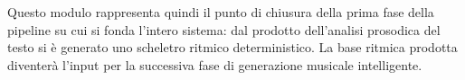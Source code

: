 Questo modulo rappresenta quindi il punto di chiusura della prima fase della pipeline su cui si fonda l'intero sistema: dal prodotto 
dell'analisi prosodica del testo si è generato uno scheletro ritmico deterministico. La base ritmica prodotta diventerà l'input per la 
successiva fase di generazione musicale intelligente.


